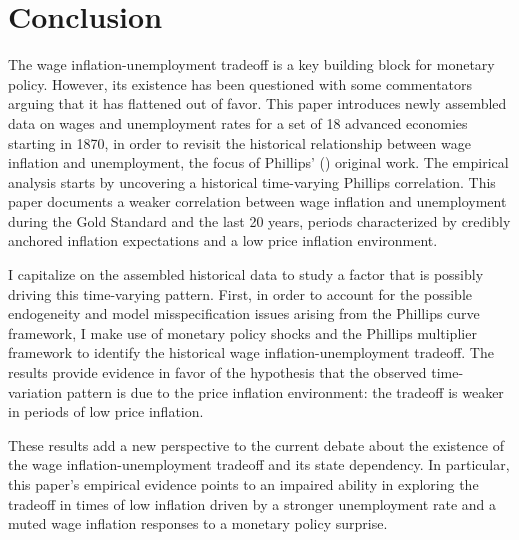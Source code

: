 \documentclass[12pt]{article}
\begin{document}

\section{Conclusion \label{S_Conclusion}}

The wage inflation-unemployment tradeoff is a key building block for monetary policy. However, its existence has been questioned with some commentators arguing that it has flattened out of favor. This paper introduces newly assembled data on wages and unemployment rates for a set of 18 advanced economies starting in 1870, in order to revisit the historical relationship between wage inflation and unemployment, the focus of Phillips' (\citeyear{Phillips1958}) original work. The empirical analysis starts by uncovering a historical time-varying Phillips correlation. This paper documents a weaker correlation between wage inflation and unemployment during the Gold Standard and the last 20 years, periods characterized by credibly anchored inflation expectations and a low price inflation environment.

I capitalize on the assembled historical data to study a factor that is possibly driving this time-varying pattern. First, in order to account for the possible endogeneity and model misspecification issues arising from the Phillips curve framework, I make use of monetary policy shocks and the Phillips multiplier framework to identify the historical wage inflation-unemployment tradeoff. The results provide evidence in favor of the hypothesis that the observed time-variation pattern is due to the price inflation environment: the tradeoff is weaker in periods of low price inflation.

These results add a new perspective to the current debate about the existence of the wage inflation-unemployment tradeoff and its state dependency. In particular, this paper's empirical evidence points to an impaired ability in exploring the tradeoff in times of low inflation driven by a stronger unemployment rate and a  muted wage inflation responses to a monetary policy surprise. 






\clearpage
\end{document}
